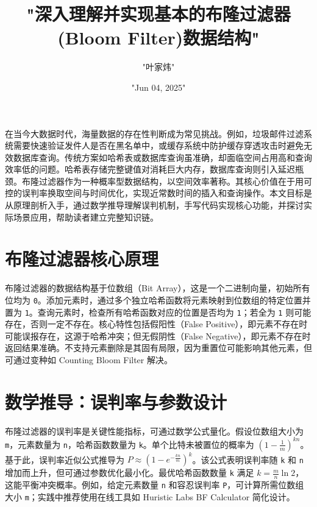 \title{"深入理解并实现基本的布隆过滤器(Bloom Filter)数据结构"}
\author{"叶家炜"}
\date{"Jun 04, 2025"}
\maketitle
在当今大数据时代，海量数据的存在性判断成为常见挑战。例如，垃圾邮件过滤系统需要快速验证发件人是否在黑名单中，或缓存系统中防护缓存穿透攻击时避免无效数据库查询。传统方案如哈希表或数据库查询虽准确，却面临空间占用高和查询效率低的问题。哈希表存储完整键值对消耗巨大内存，数据库查询则引入延迟瓶颈。布隆过滤器作为一种概率型数据结构，以空间效率著称。其核心价值在于用可控的误判率换取空间与时间优化，实现近常数时间的插入和查询操作。本文目标是从原理剖析入手，通过数学推导理解误判机制，手写代码实现核心功能，并探讨实际场景应用，帮助读者建立完整知识链。\par
\chapter{布隆过滤器核心原理}
布隆过滤器的数据结构基于位数组（Bit Array），这是一个二进制向量，初始所有位均为 \verb!0!。添加元素时，通过多个独立哈希函数将元素映射到位数组的特定位置并置为 \verb!1!。查询元素时，检查所有哈希函数对应的位置是否均为 \verb!1!；若全为 \verb!1! 则可能存在，否则一定不存在。核心特性包括假阳性（False Positive），即元素不存在时可能误报存在，这源于哈希冲突；但无假阴性（False Negative），即元素不存在时返回结果准确。不支持元素删除是其固有局限，因为重置位可能影响其他元素，但可通过变种如 Counting Bloom Filter 解决。\par
\chapter{数学推导：误判率与参数设计}
布隆过滤器的误判率是关键性能指标，可通过数学公式量化。假设位数组大小为 \verb!m!，元素数量为 \verb!n!，哈希函数数量为 \verb!k!。单个比特未被置位的概率为 $(1 - \frac{1}{m})^{kn}$。基于此，误判率近似公式推导为 $P \approx (1 - e^{-\frac{kn}{m}})^k$。该公式表明误判率随 \verb!k! 和 \verb!n! 增加而上升，但可通过参数优化最小化。最优哈希函数数量 \verb!k! 满足 $k = \frac{m}{n} \ln 2$，这能平衡冲突概率。例如，给定元素数量 \verb!n! 和容忍误判率 \verb!P!，可计算所需位数组大小 \verb!m!；实践中推荐使用在线工具如 Huristic Labs BF Calculator 简化设计。\par
